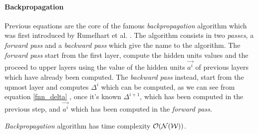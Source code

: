 \paragraph{Backpropagation}

Previous equations are the core of the famous \textit{backpropagation} algorithm which was first introduced by Rumelhart et al. \cite{Rumelhart86}.
The algorithm consists in two \textit{passes}, a \textit{forward pass} and a \textit{backward pass} which give the name to the algorithm.
The \textit{forward pass} start from the first layer, compute the hidden units values and the proceed to upper layers using the value of the hidden units 
$\vec{a^i}$ of previous layers which have already been computed. The \textit{backward pass} instead, start from the upmost layer and computes $\Delta^{i}$
which can be computed, as we can see from equation \ref{fnn_delta} , once it's known $\Delta^{i+1}$, which has been computed in the previous step, and $\vec{a^i}$ which
has been computed in the \textit{forward pass}.

\textit{Backpropagation} algorithm has time complexity $\mathcal{O}(\mathcal{N}(\mathcal{W}))$.

